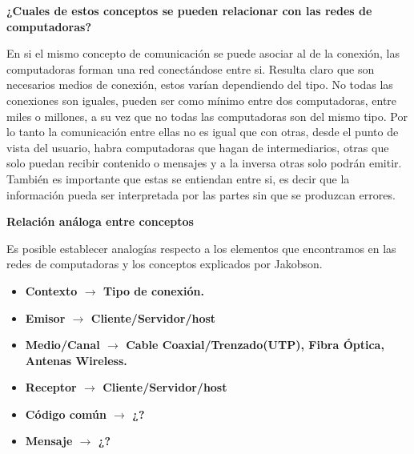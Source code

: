 \documentclass[a4paper,12pt,titlepage]{article} %
\begin{document}
{\Large \textbf{¿Cuales de estos conceptos se pueden relacionar con las redes de computadoras?}}\newline

En si el mismo concepto de comunicación se puede asociar al de la conexión, las computadoras forman una red conectándose entre si. Resulta claro que son necesarios medios de conexión, estos varían dependiendo del tipo. No todas las conexiones son iguales, pueden ser como mínimo entre dos computadoras, entre miles o millones, a su vez que no todas las computadoras son del mismo tipo. Por lo tanto la comunicación entre ellas no es igual que con otras, desde el punto de vista del usuario, habra computadoras que hagan de intermediarios, otras que solo puedan recibir contenido o mensajes y a la inversa otras solo podrán emitir. También es importante que estas se entiendan entre si, es decir que la información pueda ser interpretada por las partes sin que se produzcan errores.

\newpage

{\Large \textbf{Relación análoga entre conceptos}}\newline

Es posible establecer analogías respecto a los elementos que encontramos en las redes de computadoras y los conceptos explicados por Jakobson.

\begin{itemize}
\item \textbf{Contexto $\rightarrow$ Tipo de conexión.}
\item \textbf{Emisor $\rightarrow$ Cliente/Servidor/host}
\item \textbf{Medio/Canal $\rightarrow$ Cable Coaxial/Trenzado(UTP), Fibra Óptica, Antenas Wireless.}
\item \textbf{Receptor $\rightarrow$ Cliente/Servidor/host} 
\item \textbf{Código común $\rightarrow$ ¿?}
\item \textbf{Mensaje $\rightarrow$ ¿?}
\end{itemize}
\end{document}
